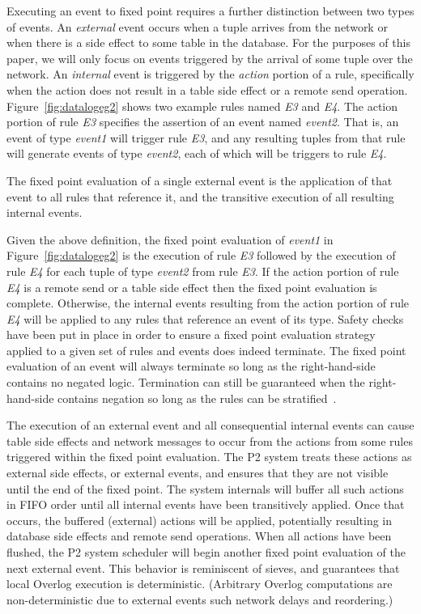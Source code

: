 {Executing an event to fixed point requires a further distinction between two types
of events. An {\em external} event occurs when a tuple arrives from the network
or when there is a side effect to some table in the database.  For the purposes
of this paper, we will only focus on events triggered by the arrival of some
tuple over the network.  An {\em internal} event is triggered by the {\em action}
portion of a rule, specifically when the action does not result in a table side effect
or a remote send operation.  Figure~\ref{fig:datalogeg2} shows two example 
rules named {\em E3} and {\em E4}.  The action portion of rule {\em E3} specifies 
the assertion of an event named {\em event2}. That is, an event of type {\em event1} 
will trigger rule {\em E3}, and any resulting tuples from that rule will generate events of 
type {\em event2}, each of which will be triggers to rule {\em E4}. 

\begin{definition}
The fixed point evaluation of a single external event is the application
of that event to all rules that reference it, and the transitive execution of
all resulting internal events. 
\end{definition}

Given the above definition, the fixed point evaluation of {\em event1} in
Figure~\ref{fig:datalogeg2} is the execution of rule {\em E3} followed 
by the execution of rule {\em E4} for each tuple of type {\em event2} from
rule {\em E3}.  If the action portion of rule {\em E4} is a remote send or
a table side effect then the fixed point evaluation is complete. Otherwise, the
internal events resulting from the action portion of rule {\em E4} will be
applied to any rules that reference an event of its type.  Safety 
checks have been put in place in order to ensure a fixed point evaluation
strategy applied to a given set of rules and events does indeed terminate.  
The fixed point evaluation of an event will always
terminate so long as the right-hand-side contains no negated logic.  Termination
can still be guaranteed when the right-hand-side contains negation so
long as the rules can be stratified~\cite{loo-sigmod06}. 

The execution of an external event and all consequential internal events 
can cause table side effects and network messages to occur from the
actions from some rules triggered within the fixed point evaluation.  The
P2 system treats these actions as external side effects, or external events,
and ensures that they are not visible until the end of the fixed point. The
system internals will buffer all such actions in FIFO order until all internal events have 
been transitively applied.  Once that occurs, the buffered (external) actions
will be applied, potentially resulting in database side effects and remote
send operations.  When all actions have been flushed, the P2 system 
scheduler will begin another fixed point evaluation of the next external
event.  This behavior is reminiscent of sieves, and guarantees that local 
Overlog execution is deterministic. (Arbitrary Overlog computations are 
non-deterministic due to external events such network delays and reordering.)


}
